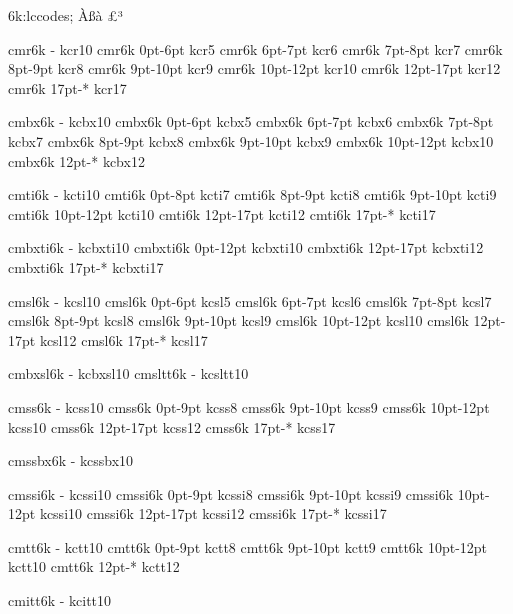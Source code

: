 \modifydef 6k:lccodes; {%
   \skipfirststep
   \lccodesloop ^^c0^^df^^e0%
   \lccodes ^^a3^^b3%
   \def\lccodesback {\zerolccodes ^^c0^^ff%
                     \zerolccodes ^^a3^^a3%
                     \zerolccodes ^^b3^^b3}%
}

\registertfm cmr6k     -      kcr10 %
\registertfm cmr6k  0pt-6pt   kcr5  %
\registertfm cmr6k  6pt-7pt   kcr6  %
\registertfm cmr6k  7pt-8pt   kcr7  %
\registertfm cmr6k  8pt-9pt   kcr8  %
\registertfm cmr6k  9pt-10pt  kcr9  %
\registertfm cmr6k  10pt-12pt kcr10 %
\registertfm cmr6k  12pt-17pt kcr12 %
\registertfm cmr6k  17pt-*    kcr17 %

\registertfm cmbx6k    -      kcbx10 %
\registertfm cmbx6k 0pt-6pt   kcbx5  %
\registertfm cmbx6k 6pt-7pt   kcbx6  %
\registertfm cmbx6k 7pt-8pt   kcbx7  %
\registertfm cmbx6k 8pt-9pt   kcbx8  %
\registertfm cmbx6k 9pt-10pt  kcbx9  %
\registertfm cmbx6k 10pt-12pt kcbx10 %
\registertfm cmbx6k 12pt-*    kcbx12 %

\registertfm cmti6k    -      kcti10 %
\registertfm cmti6k 0pt-8pt   kcti7  %
\registertfm cmti6k 8pt-9pt   kcti8  %
\registertfm cmti6k 9pt-10pt  kcti9  %
\registertfm cmti6k 10pt-12pt kcti10 %
\registertfm cmti6k 12pt-17pt kcti12 %
\registertfm cmti6k 17pt-*    kcti17 %

\registertfm cmbxti6k    -      kcbxti10 %
\registertfm cmbxti6k 0pt-12pt  kcbxti10 %
\registertfm cmbxti6k 12pt-17pt kcbxti12 %
\registertfm cmbxti6k 17pt-*    kcbxti17 %

\registertfm cmsl6k     -      kcsl10 %
\registertfm cmsl6k  0pt-6pt   kcsl5  %
\registertfm cmsl6k  6pt-7pt   kcsl6  %
\registertfm cmsl6k  7pt-8pt   kcsl7  %
\registertfm cmsl6k  8pt-9pt   kcsl8  %
\registertfm cmsl6k  9pt-10pt  kcsl9  %
\registertfm cmsl6k  10pt-12pt kcsl10 %
\registertfm cmsl6k  12pt-17pt kcsl12 %
\registertfm cmsl6k  17pt-*    kcsl17 %

\registertfm cmbxsl6k  -      kcbxsl10 %
\registertfm cmsltt6k  -      kcsltt10 %

\registertfm cmss6k    -      kcss10 %
\registertfm cmss6k 0pt-9pt   kcss8  %
\registertfm cmss6k 9pt-10pt  kcss9  %
\registertfm cmss6k 10pt-12pt kcss10 %
\registertfm cmss6k 12pt-17pt kcss12 %
\registertfm cmss6k 17pt-*    kcss17 %

\registertfm cmssbx6k   -      kcssbx10 %

\registertfm cmssi6k    -      kcssi10 %
\registertfm cmssi6k 0pt-9pt   kcssi8  %
\registertfm cmssi6k 9pt-10pt  kcssi9  %
\registertfm cmssi6k 10pt-12pt kcssi10 %
\registertfm cmssi6k 12pt-17pt kcssi12 %
\registertfm cmssi6k 17pt-*    kcssi17 %

\registertfm cmtt6k    -      kctt10 %
\registertfm cmtt6k 0pt-9pt   kctt8  %
\registertfm cmtt6k 9pt-10pt  kctt9  %
\registertfm cmtt6k 10pt-12pt kctt10 %
\registertfm cmtt6k 12pt-*    kctt12 %

\registertfm cmitt6k    -     kcitt10 %

